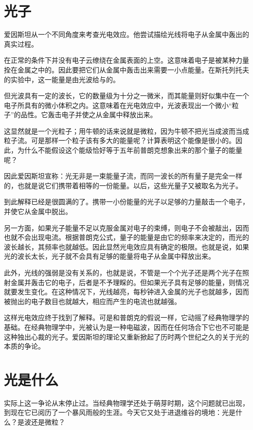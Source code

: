 \section{光子}

爱因斯坦从一个不同角度来考查光电效应。他尝试描绘光线将电子从金属中轰出的真实过程。

在正常的条件下并没有电子云缭绕在金属表面的上空。这意味着电子是被某种力量拴在金属之中的。因此要把它们从金属中轰击出来需要一小点能量。在斯托列托夫的实验中，这一能量是由光波给与的。

但光波具有一定的波长，它的数量级为十分之一微米，而其能量则好似集中在一个电子所具有的微小体积之内。这意味着在光电效应中，光波表现出一个微小“粒子”的品性。它轰击电子并使之从金属中释放出来。

这显然就是一个光粒子；用牛顿的话来说就是微粒，因为牛顿不把光当成波而当成粒子流。可是那样一个粒子该有多大的能量呢？计算表明这个能像是很小的。因此，为什么不能假设这个能级恰好等于五年前普朗克想象出来的那个量子的能量呢？

因此爱因斯坦宣称：光无非是一束能量子流，而同一波长的所有量子是完全一样的，也就是说它们携带着相等的一份能量。以后，这些光量子又被取名为光子。

到此解释已经是很圆满的了。携带一小份能量的光子以足够的力量敲击一个电子，并使它从金属中脱出。

另一方面，如果光子能量不足以克服金属对电子的束缚，则电子不会被敲出，因而也就不会出现电流。根据普朗克公式，量子的能量是由它的频率来决定的，而光的波长越长，其频率也就越低。因此显然光电效应具有确定的极限。也就是说，如果光的波长太长，光子就不会具有足够的能量将电子从金属中释放出来。

此外，光线的强弱是没有关系的，也就是说，不管是一个个光子还是两个光子在照射金属并轰击它的电子，后者是不予理睬的。但如果光子具有足够的能量，则情况就要发生变化。在这种情况下，光线越亮，每秒钟进入金属的光子也就越多，因而被抛出的电子数目也就越大，相应而产生的电流也就越强。

这样光电效应终于找到了解释。可是和普朗克的假说一样，它动摇了经典物理学的基础。在经典物理学中，光被认为是一种电磁波，因而在任何场合下它也不可能是这种独出心裁的光子。爱因斯坦的理论又重新掀起了历时两个世纪之久的关于光的本质的争论。

\section{光是什么}

实际上这一争论从末停止过。当经典物理学还处于萌芽时期，这个问题就已出现，到现在它已阅历了一个暴风雨般的生涯。今天它又处于进退维谷的境地：光是什么？是波还是微粒？

